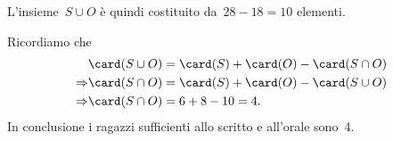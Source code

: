 \begin{exrig}
\begin{esempio}
L'insieme~$S\cup O$ è quindi costituito da~$28-18=10$ elementi.

Ricordiamo che
\begin{align*}
 &\card(S\cup O)=\card(S)+\card(O)-\card(S\cap O)\\
 \Rightarrow &\card(S\cap O)=\card(S)+\card(O)-\card(S\cup O)\\
 \Rightarrow &\card(S\cap O)=6+8-10=4.
\end{align*}
In conclusione i ragazzi sufficienti allo scritto e all'orale sono~4.
\end{esempio}
\end{exrig}

\ovalbox{\risolvii \ref{ese:\thechapter.78}, \ref{ese:\thechapter.79}, \ref{ese:\thechapter.80}, \ref{ese:\thechapter.81}, \ref{ese:\thechapter.82}, \ref{ese:\thechapter.83}, \ref{ese:\thechapter.84}, \ref{ese:\thechapter.85}, \ref{ese:\thechapter.86}, \ref{ese:\thechapter.87},
\ref{ese:\thechapter.88}, \ref{ese:\thechapter.89}, \ref{ese:\thechapter.90}}

\vspazio\ovalbox{\ref{ese:\thechapter.91}}

\newpage

\cleardoublepage
